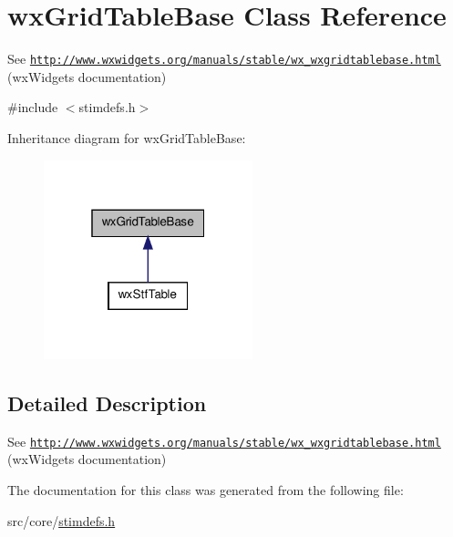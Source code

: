 \hypertarget{classwxGridTableBase}{
\section{wxGridTableBase Class Reference}
\label{classwxGridTableBase}
}


See \href{http://www.wxwidgets.org/manuals/stable/wx_wxgridtablebase.html}{\tt http://www.wxwidgets.org/manuals/stable/wx\_\-wxgridtablebase.html} (wxWidgets documentation)  




{\ttfamily \#include $<$stimdefs.h$>$}



Inheritance diagram for wxGridTableBase:
\nopagebreak
\begin{figure}[H]
\begin{center}
\leavevmode
\includegraphics[width=172pt]{classwxGridTableBase__inherit__graph}
\end{center}
\end{figure}


\subsection{Detailed Description}
See \href{http://www.wxwidgets.org/manuals/stable/wx_wxgridtablebase.html}{\tt http://www.wxwidgets.org/manuals/stable/wx\_\-wxgridtablebase.html} (wxWidgets documentation) 

The documentation for this class was generated from the following file:\begin{DoxyCompactItemize}
\item 
src/core/\hyperlink{stimdefs_8h}{stimdefs.h}\end{DoxyCompactItemize}
